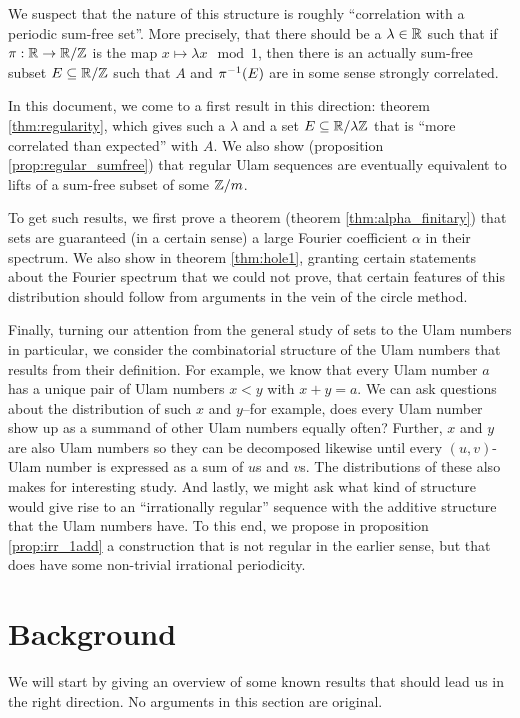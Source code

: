 \documentclass{report}
\theoremstyle{remark}
\numberwithin{equation}{section}
\begin{document}
We suspect that the nature of this structure is roughly ``correlation
with a periodic sum-free set''.  More precisely, that there should be
a $\lambda \in \mathbb{R}$ such that if $\pi : \mathbb{R} \to \mathbb{R}/\mathbb{Z}$ is the map
$x \mapsto \lambda x\mod{1}$, then there is an actually sum-free
subset $E \subseteq \mathbb{R}/\mathbb{Z}$ such that $A$ and $\pi^{-1}(E)$ are in some
sense strongly correlated.

In this document, we come to a first result in this direction: theorem
\ref{thm:regularity}, which gives such a $\lambda$ and a set
$E \subseteq \mathbb{R}/\lambda\mathbb{Z}$ that is ``more correlated than expected''
with $A$.  We also show (proposition \ref{prop:regular_sumfree}) that
regular Ulam sequences are eventually equivalent to lifts of a
sum-free subset of some $\mathbb{Z}/m$.

To get such results, we first prove a theorem (theorem
\ref{thm:alpha_finitary}) that \relevant sets are guaranteed (in a
certain sense) a large Fourier coefficient $\alpha$ in their spectrum.
We also show in theorem \ref{thm:hole1}, granting certain statements
about the Fourier spectrum that we could not prove, that certain
features of this distribution should follow from arguments in the vein
of the circle method.

Finally, turning our attention from the general study of \relevant
sets to the Ulam numbers in particular, we consider the combinatorial
structure of the Ulam numbers that results from their definition.  For
example, we know that every Ulam number $a$ has a unique pair of Ulam
numbers $x < y$ with $x + y = a$.  We can ask questions about the
distribution of such $x$ and $y$--for example, does every Ulam number
show up as a summand of other Ulam numbers equally often?  Further,
$x$ and $y$ are also Ulam numbers so they can be decomposed likewise
until every $(u,v)$-Ulam number is expressed as a sum of $u$s and
$v$s.  The distributions of these also makes for interesting study.
And lastly, we might ask what kind of structure would give rise to an
``irrationally regular'' sequence with the additive structure that the
Ulam numbers have.  To this end, we propose in proposition
\ref{prop:irr_1add} a construction that is not regular in the earlier
sense, but that does have some non-trivial irrational periodicity.

\chapter{Background}

We will start by giving an overview of some known results that should
lead us in the right direction.  No arguments in this section are
original.
\end{document}
